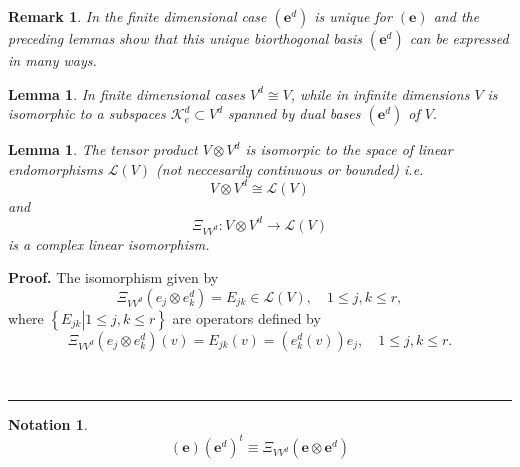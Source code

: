 \documentclass[aps,preprint]{revtex4}%
\newtheorem{lemma}[theorem]{Lemma}
\newtheorem{notation}[theorem]{Notation}
\newtheorem{remark}[theorem]{Remark}
\newenvironment{proof}[1][Proof]{\noindent\textbf{#1.} }{\ \rule{0.5em}{0.5em}}
\begin{document}
\begin{remark}
In the finite dimensional case $\left(  \mathbf{e}^{d}\right)  $ is unique for
$\left(  \mathbf{e}\right)  $ and the preceding lemmas show that this unique
biorthogonal basis $\left(  \mathbf{e}^{d}\right)  $ can be expressed in many ways.
\end{remark}

\begin{lemma}
In finite dimensional cases $V^{d}\cong V$, while in infinite dimensions $V$
is isomorphic to a subspaces $\mathcal{K}_{e}^{d}\subset V^{d}$ spanned by
dual bases $\left(  \mathbf{e}^{d}\right)  $ of $V.$
\end{lemma}

\begin{lemma}
The tensor product $V\otimes V^{d}$ is isomorpic to the space of linear
endomorphisms $\mathcal{L}\left(  V\right)  $ (not neccesarily continuous or
bounded) i.e.
\begin{equation}
V\otimes V^{d}\cong\mathcal{L}\left(  V\right)
\end{equation}
and
\begin{equation}
\Xi_{VV^{d}}:V\otimes V^{d}\rightarrow\mathcal{L}\left(  V\right)
\end{equation}
is a complex linear isomorphism.
\end{lemma}

\begin{proof}
The isomorphism given by
\begin{equation}
\Xi_{VV^{d}}\left(  e_{j}\otimes e_{k}^{d}\right)  =E_{jk}\in\mathcal{L}%
\left(  V\right)  ,\quad1\leq j,k\leq r,
\end{equation}
where $\left\{  \left.  E_{jk}\right\vert 1\leq j,k\leq r\right\}  $ are
operators defined by
\begin{equation}
\Xi_{VV^{d}}\left(  e_{j}\otimes e_{k}^{d}\right)  \left(  v\right)
=E_{jk}\left(  v\right)  =\left(  e_{k}^{d}\left(  v\right)  \right)
e_{j},\quad1\leq j,k\leq r.
\end{equation}

\end{proof}

\begin{notation}%
\begin{equation}
\left(  \mathbf{e}\right)  \left(  \mathbf{e}^{d}\right)  ^{t}\equiv
\Xi_{VV^{d}}\left(  \mathbf{e}\otimes\mathbf{e}^{d}\right)
\end{equation}

\end{notation}
\end{document}
